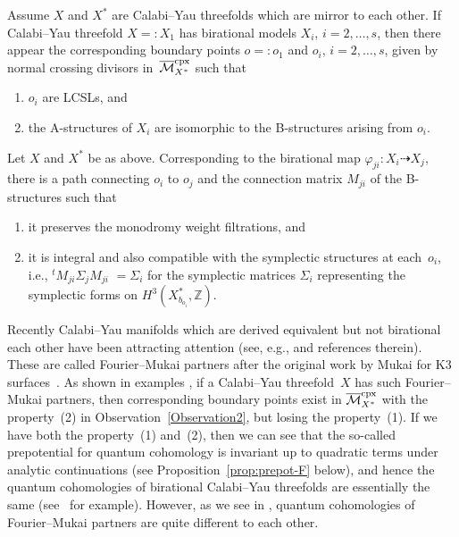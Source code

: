 \documentclass[pdftex]{sigma}
\numberwithin{equation}{section}
\begin{document}
\begin{Observation}\label{Observation1} %
Assume $X$ and $X^{*}$ are Calabi--Yau threefolds which are mirror to each other. If Calabi--Yau threefold $X=:X_{1}$ has birational models $X_{i}$, $i=2,\dots ,s$, then there appear the corresponding boundary points $o=:o_{1}$ and $o_{i}$, $i=2,\dots ,s$, given by normal crossing divisors in~$\overline{\mathcal{M}}_{X^{*}}^{\rm cpx}$ such that
\begin{enumerate}\itemsep=0pt
\item[(1)] $o_{i}$ are LCSLs, and
\item[(2)] the A-structures of $X_{i}$ are isomorphic to the B-structures
arising from $o_{i}$.
\end{enumerate}
\end{Observation}

\begin{Observation}\label{Observation2}
Let $X$ and $X^{*}$ be as above. Corresponding to the birational map $\varphi_{ji}\colon X_{i}\dashrightarrow X_{j}$, there is a path connecting $o_{i}$ to $o_{j}$ and the connection matrix $M_{ji}$ of the B-structures such that

\begin{enumerate}\itemsep=0pt
\item[(1)] it preserves the monodromy weight filtrations, and
\item[(2)] it is integral and also compatible with the symplectic structures at each~$o_{i}$, i.e., $^{t}M_{ji}\Sigma_{j}M_{ji}$ $=\Sigma_{i}$ for the symplectic matrices $\Sigma_{i}$ representing the symplectic forms on $H^{3}(X_{b_{o_{i}}}^{*},\mathbb{Z})$.
\end{enumerate}
\end{Observation}

\begin{Remark}Recently Calabi--Yau manifolds which are derived equivalent but not birational each other have been attracting attention (see, e.g., \cite{BoCa,HTjag,HoTaCIV,Kuz2} and references therein). These are called Fourier--Mukai partners after the original work by Mukai for K3 surfaces~\cite{Mukai}. As shown in examples \cite{BoCa,HTjag,vSt}, if a Calabi--Yau threefold~$X$ has such Fourier--Mukai partners, then corresponding boundary points exist in $\overline{\mathcal{M}}_{X^{*}}^{\rm cpx}$ with the property~(2) in Observation~\ref{Observation2}, but losing the property~(1). If we have both the property~(1) and~(2), then we can see that the so-called prepotential for quantum cohomology is invariant up to quadratic terms under analytic continuations (see Proposition~\ref{prop:prepot-F} below), and hence the quantum cohomologies of birational Calabi--Yau threefolds are essentially the same (see~\cite{LLWang} for example). However, as we see in \cite{BCKvS,HoKo,HTjag,Ro}, quantum cohomologies of Fourier--Mukai partners are quite different to each other.
\end{Remark}
\end{document}
